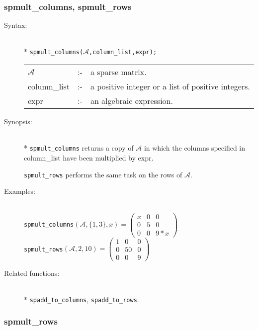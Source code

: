\subsubsection{spmult\_columns, spmult\_rows}
\label{sparse:spmult_columns}

\begin{description}
\item[Syntax:]\mbox{}\\*
\texttt{spmult\_columns($\mathcal{A}$,column\_list,expr);}\\[2mm]
\begin{tabular}{l l l}
$\mathcal{A}$   &:-& a sparse matrix. \\
column\_list &:-& a positive integer or a list of positive integers. \\
expr        &:-& an algebraic expression.
\end{tabular}

\item[Synopsis:]\mbox{}\\*
\texttt{spmult\_columns} returns a copy of $\mathcal{A}$ in which
                the columns specified in column\_list have been
multiplied by expr.

\texttt{spmult\_rows} performs the same task on the rows of $\mathcal{A}$.

\item[Examples:]\mbox{}\\
\texttt{spmult\_columns}\((\mathcal{A},\{1,3\},x) =
        \begin{pmatrix} x & 0 & 0 \\ 0 & 5 & 0 \\ 0 & 0 & 9*x \end{pmatrix}\) \\[2mm]
\texttt{spmult\_rows}\((\mathcal{A},2,10)  =
        \begin{pmatrix} 1 & 0 & 0 \\ 0 & 50 & 0 \\ 0 & 0 & 9 \end{pmatrix}\)

\item[Related functions:]\mbox{}\\*
\texttt{spadd\_to\_columns}, \texttt{spadd\_to\_rows}.
\end{description}

\subsubsection{spmult\_rows}
\label{sparse:spmult_rows}

